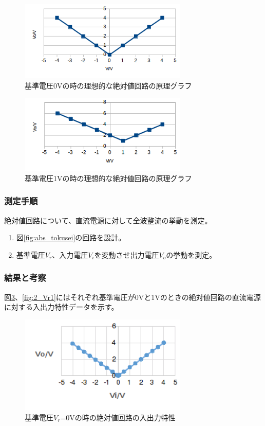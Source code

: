 \documentclass[11pt,a4j]{jsarticle}
\begin{document}
    \begin{figure}[htbp]
  \centering
  \includegraphics[width=8cm,clip]{risou_absr0.png}
  \caption{基準電圧0Vの時の理想的な絶対値回路の原理グラフ}
  \label{fig:risou_absr0}
 \end{figure}
    
    \begin{figure}[htbp]
  \centering
  \includegraphics[width=8cm,clip]{risou_absr1.png}
  \caption{基準電圧1Vの時の理想的な絶対値回路の原理グラフ}
  \label{fig:risou_absr1}
 \end{figure}
    
    
    
   \subsubsection{測定手順}
    絶対値回路について、直流電源に対して全波整流の挙動を測定。
    \begin{enumerate}
    \item 図\ref{fig:abs_tokusei}の回路を設計。
    \item 基準電圧$V_r$、入力電圧$V_i$を変動させ出力電圧$V_o$の挙動を測定。
    \end{enumerate}
    
   \subsubsection{結果と考察}
    
    図\ref{fig:2_Vr0}、\ref{fig:2_Vr1}にはそれぞれ基準電圧が0Vと1Vのときの絶対値回路の直流電源に対する入出力特性データを示す。
    
    \begin{figure}[htbp]
  \centering
  \includegraphics[width=8cm,clip]{2_Vr0.png}
  \caption{基準電圧$V_r$=0Vの時の絶対値回路の入出力特性}
  \label{fig:2_Vr0}
 \end{figure}%
    
\end{document}
